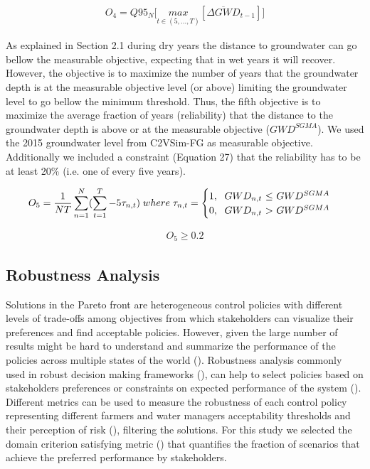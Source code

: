 \documentclass[11pt,a4paper]{article}
\begin{document}
\begin{align}
O_{4} = Q95_{N} \bigg[\underset{t\in(5,...,T)}{max}[\overline{\Delta GWD}_{t-1}]\bigg]
\end{align}

As explained in Section 2.1 during dry years the distance to groundwater can go bellow the measurable objective, expecting that in wet years it will recover. However, the objective is to maximize the number of years that the groundwater depth is at the measurable objective level (or above) limiting the groundwater level to go bellow the minimum threshold. Thus, the fifth objective is to maximize the average fraction of years (reliability) that the distance to the groundwater depth is above or at the measurable objective ($GWD^{SGMA}$).  We used the 2015 groundwater level from C2VSim-FG as measurable objective. Additionally we included a constraint (Equation 27) that the reliability has to be at least 20\% (i.e. one of every five years). 

\begin{align}
O_{5} = \frac{1}{NT}\sum_{n=1}^N(\sum_{t=1}^T-5 \tau_{n,t})\; where\; \tau_{n,t} = \begin{cases}
      1, \text{\; $GWD_{n,t}$  $\leq$ $GWD^{SGMA}$}\\
      0, \text{\; $GWD_{n,t}$ $>$ $GWD^{SGMA}$}\\
\end{cases}      
\end{align}


\begin{align}
O_{5} \geq 0.2
\end{align}

\subsection{Robustness Analysis}

Solutions in the Pareto front are heterogeneous control policies with different levels of trade-offs among objectives from which stakeholders can visualize their preferences and find acceptable policies. However, given the large number of results might be hard to understand and summarize the performance of the policies across multiple states of the world (\cite{herman_how_2015}). Robustness analysis commonly used in robust decision making frameworks (\cite{lempert_making_2013}), can help to select policies based on stakeholders preferences or constraints on expected performance of the system (\cite{kasprzyk_many_2013}). Different metrics can be used to measure the robustness of each control policy representing different farmers and water managers acceptability thresholds and their perception of risk (\cite{mcphail_robustness_2018}), filtering the solutions. For this study we selected the domain criterion satisfying metric (\cite{schneller_decision_1983}) that quantifies the fraction of scenarios that achieve the preferred performance by stakeholders. 
\end{document}
